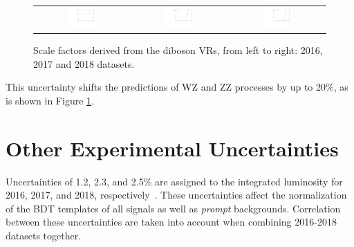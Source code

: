 \begin{figure}[tbh!]
 \begin{center}
 \begin{tabular}{ccc}
  \includegraphics[width=0.325\textwidth]{figures/Part3/Systematics/2016_VV_Sys_1D}&
    \includegraphics[width=0.325\textwidth]{figures/Part3/Systematics/2017_VV_Sys_1D}&
  \includegraphics[width=0.325\textwidth]{figures/Part3/Systematics/2018_VV_Sys_1D}\\
 \end{tabular}
 \caption{Scale factors derived from the diboson \acp{VR}, from left to right: 2016, 2017 and 2018 datasets.}
 \label{fig:SF_VV}
 \end{center}
\end{figure}

This uncertainty shifts the predictions of WZ and ZZ processes by up to 20$\%$, as is shown in Figure \ref{fig:SF_VV}.

\section{Other Experimental Uncertainties}
\label{sec:OthUnc}

Uncertainties of 1.2, 2.3, and 2.5\% are assigned to the integrated luminosity for 2016, 2017, and 2018, respectively~\cite{CMS:2021xjt,CMS-LUM-17-004,CMS-LUM-18-002}. These uncertainties affect the normalization of the \ac{BDT} templates of all signals as well as \emph{prompt} backgrounds. Correlation between these uncertainties are taken into account when combining 2016-2018 datasets together. 

